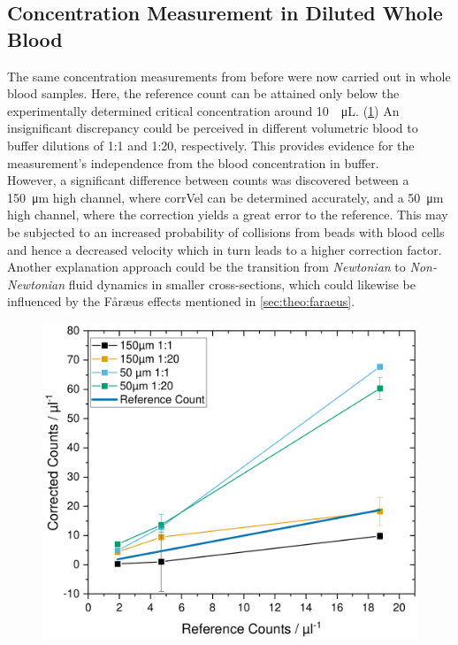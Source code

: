 \subsection{Concentration Measurement in Diluted Whole Blood}
The same concentration measurements from before were now carried out in whole blood samples. Here, the reference count can be attained only below the experimentally determined critical concentration around \SI{10}{\per\micro\liter}. (\cref{fig:conc:blood}) An insignificant discrepancy could be perceived in different volumetric blood to buffer dilutions of 1:1 and 1:20, respectively. This provides evidence for the measurement's independence from the blood concentration in buffer. \\
However, a significant difference between counts was discovered between a \SI{150}{\micro\meter} high channel, where \gls{corrVel} can be determined accurately, and a \SI{50}{\micro\meter} high channel, where the correction yields a great error to the reference. This may be subjected to an increased probability of collisions from beads with blood cells and hence a decreased velocity which in turn leads to a higher correction factor. Another explanation approach could be the transition from \textit{Newtonian} to \textit{Non-Newtonian} fluid dynamics in smaller cross-sections, which could likewise be influenced by the F\aa{}r\ae{}us effects mentioned in \cref{sec:theo:faraeus}.
\begin{figure}[b!]
	\centering
	\includegraphics[width=.7\linewidth]{Ressources/Concentration/CorrectionBlood}
	\label{fig:conc:blood}
\end{figure}
